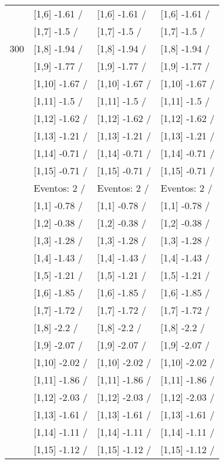 \begin{table}
\begin{tabular}[t]{llll}
 & {}[1,6] -1.61  / & {}[1,6] -1.61  / & {}[1,6] -1.61  /\\
 & {}[1,7] -1.5  / & {}[1,7] -1.5  / & {}[1,7] -1.5  /\\
300 & {}[1,8] -1.94  / & {}[1,8] -1.94  / & {}[1,8] -1.94  /\\
\addlinespace
 & {}[1,9] -1.77  / & {}[1,9] -1.77  / & {}[1,9] -1.77  /\\
 & {}[1,10] -1.67  / & {}[1,10] -1.67  / & {}[1,10] -1.67  /\\
 & {}[1,11] -1.5  / & {}[1,11] -1.5  / & {}[1,11] -1.5  /\\
 & {}[1,12] -1.62  / & {}[1,12] -1.62  / & {}[1,12] -1.62  /\\
 & {}[1,13] -1.21  / & {}[1,13] -1.21  / & {}[1,13] -1.21  /\\
\addlinespace
 & {}[1,14] -0.71  / & {}[1,14] -0.71  / & {}[1,14] -0.71  /\\
 & {}[1,15] -0.71  / & {}[1,15] -0.71  / & {}[1,15] -0.71  /\\
 & Eventos:  2 / & Eventos:  2 / & Eventos:  2 /\\
 & {}[1,1] -0.78  / & {}[1,1] -0.78  / & {}[1,1] -0.78  /\\
 & {}[1,2] -0.38  / & {}[1,2] -0.38  / & {}[1,2] -0.38  /\\
\addlinespace
 & {}[1,3] -1.28  / & {}[1,3] -1.28  / & {}[1,3] -1.28  /\\
 & {}[1,4] -1.43  / & {}[1,4] -1.43  / & {}[1,4] -1.43  /\\
 & {}[1,5] -1.21  / & {}[1,5] -1.21  / & {}[1,5] -1.21  /\\
 & {}[1,6] -1.85  / & {}[1,6] -1.85  / & {}[1,6] -1.85  /\\
 & {}[1,7] -1.72  / & {}[1,7] -1.72  / & {}[1,7] -1.72  /\\
\addlinespace
500 & {}[1,8] -2.2  / & {}[1,8] -2.2  / & {}[1,8] -2.2  /\\
 & {}[1,9] -2.07  / & {}[1,9] -2.07  / & {}[1,9] -2.07  /\\
 & {}[1,10] -2.02  / & {}[1,10] -2.02  / & {}[1,10] -2.02  /\\
 & {}[1,11] -1.86  / & {}[1,11] -1.86  / & {}[1,11] -1.86  /\\
 & {}[1,12] -2.03  / & {}[1,12] -2.03  / & {}[1,12] -2.03  /\\
\addlinespace
 & {}[1,13] -1.61  / & {}[1,13] -1.61  / & {}[1,13] -1.61  /\\
 & {}[1,14] -1.11  / & {}[1,14] -1.11  / & {}[1,14] -1.11  /\\
 & {}[1,15] -1.12  / & {}[1,15] -1.12  / & {}[1,15] -1.12  /\\
\bottomrule
\end{tabular}
\end{table}
